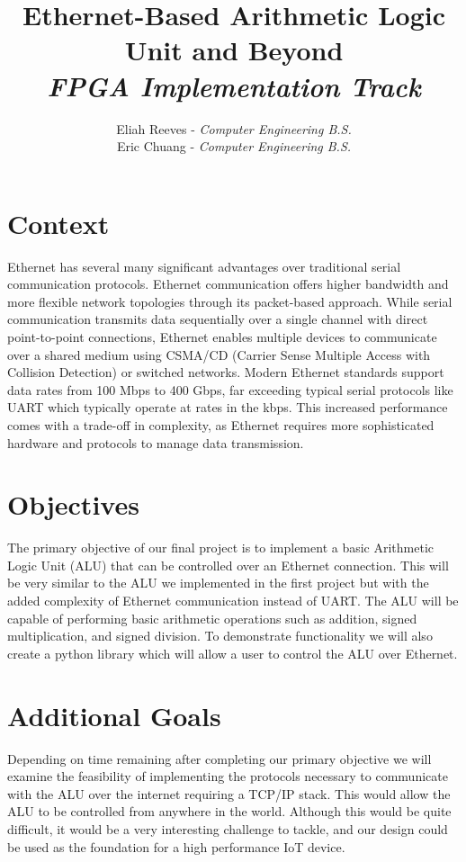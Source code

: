 \documentclass{article}
\title{Ethernet-Based Arithmetic Logic Unit and Beyond\\
        \Large \emph{FPGA Implementation Track}}
\author{{Eliah Reeves} - \emph{Computer Engineering B.S.}\\ {Eric Chuang} - \emph{Computer Engineering B.S.}}
\date{\vspace{-5ex}} %
\begin{document}
\maketitle
\thispagestyle{firstpage}
\section*{Context}

Ethernet has several many significant advantages over traditional serial communication protocols. Ethernet communication offers higher bandwidth and more flexible network topologies through its packet-based approach. While serial communication transmits data sequentially over a single channel with direct point-to-point connections, Ethernet enables multiple devices to communicate over a shared medium using CSMA/CD (Carrier Sense Multiple Access with Collision Detection) or switched networks. Modern Ethernet standards support data rates from 100 Mbps to 400 Gbps, far exceeding typical serial protocols like UART which typically operate at rates in the kbps. This increased performance comes with a trade-off in complexity, as Ethernet requires more sophisticated hardware and protocols to manage data transmission.

\section*{Objectives}

The primary objective of our final project is to implement a basic Arithmetic Logic Unit (ALU) that can be controlled over an Ethernet connection. This will be very similar to the ALU we implemented in the first project but with the added complexity of Ethernet communication instead of UART. The ALU will be capable of performing basic arithmetic operations such as addition, signed multiplication, and signed division. To demonstrate functionality we will also create a python library which will allow a user to control the ALU over Ethernet.

\section*{Additional Goals}

Depending on time remaining after completing our primary objective we will examine the feasibility of implementing the protocols necessary to communicate with the ALU over the internet requiring a TCP/IP stack. This would allow the ALU to be controlled from anywhere in the world. Although this would be quite difficult, it would be a very interesting challenge to tackle, and our design could be used as the foundation for a high performance IoT device.
\end{document}
